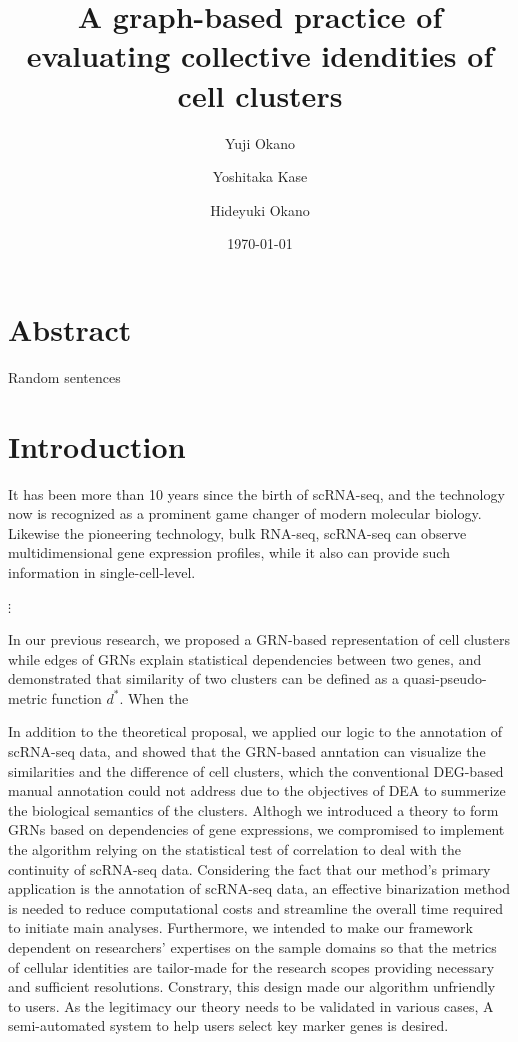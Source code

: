 \documentclass{article}
\title{
  A graph-based practice of evaluating collective idendities of cell clusters
}
\author[1,2]{Yuji Okano}
\author[2]{Yoshitaka Kase}
\author[2]{Hideyuki Okano}
\affil[1]{
  Department of Extended Intelligence for Medicine, 
  The Ishii-Ishibashi Laboratory, 
  Keio University School of Medicine
}
\affil[2]{
  Division of CNS Regeneration and Drug Discovery,
  International Center for Brain Science, 
  Fujita Health University
}
\date{\today}
\begin{document}
\maketitle

\section*{Abstract}
Random sentences

\section*{Introduction}
It has been more than 10 years since the birth of \ac{scRNA-seq}, and the technology 
now is recognized as a prominent game changer of modern molecular biology. Likewise the pioneering technology, 
bulk RNA-seq,
scRNA-seq can observe multidimensional gene expression profiles, while
it also can provide such information in single-cell-level.

$\vdots$

In our previous research, we proposed a \ac{GRN}-based
representation of cell clusters while edges of GRNs explain statistical
dependencies between two genes, and demonstrated that similarity of
two clusters can be defined as a quasi-pseudo-metric function $d^*$\cite{okano2023set}. When the 

In addition to the theoretical proposal, we applied our logic to 
the annotation of scRNA-seq data, and showed that the GRN-based anntation can visualize the similarities and the
difference of cell clusters, which the conventional \ac{DEG}-based manual annotation could not address due to the objectives of \ac{DEA} to summerize the biological semantics 
of the clusters. Althogh we introduced a theory to form GRNs based on dependencies of gene expressions, we 
compromised to implement the algorithm relying on the statistical test of 
correlation to deal with the continuity of scRNA-seq data. Considering the fact that 
our method's primary application is the annotation of scRNA-seq data, 
an effective binarization method is needed to reduce computational costs and 
streamline the overall time required to initiate main analyses. Furthermore, we 
intended to make our framework dependent on researchers' expertises on the 
sample domains so that the metrics of cellular identities are tailor-made for the 
research scopes providing necessary and sufficient resolutions. Constrary, this 
design made our algorithm unfriendly to users. As the legitimacy our theory 
needs to be validated in various cases, A semi-automated system to help users 
select key marker genes is desired.
\end{document}
